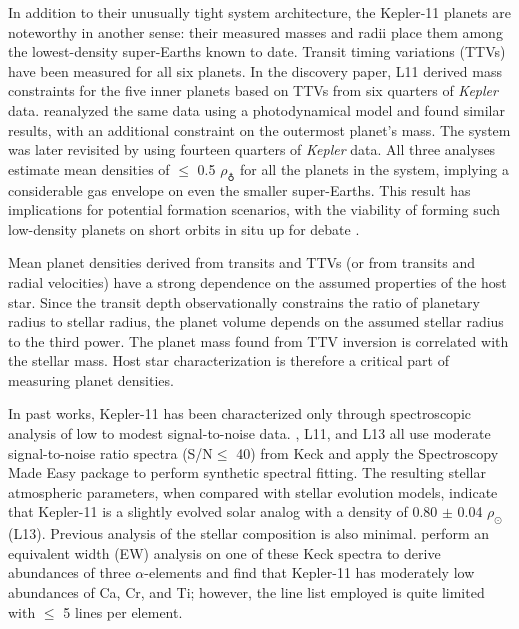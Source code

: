 \documentclass[twocolumn,trackchanges]{aastex61}
\newcommand{\Kepler}{\textit{Kepler} }
\begin{document}
In addition to their unusually tight system architecture, the Kepler-11 planets are noteworthy in another sense: their measured masses and radii place them among the lowest-density super-Earths known to date. Transit timing variations (TTVs) have been measured for all six planets. In the discovery paper,  L11 derived mass constraints for the five inner planets based on TTVs from six quarters of \Kepler data. \citet{Migaszewski2012} reanalyzed the same data using a photodynamical model and found similar results, with an additional constraint on the outermost planet's mass. The system was later revisited by \citet[][hereafter L13]{Lissauer2013} using fourteen quarters of \Kepler data. All three analyses estimate mean densities of $\leq$ 0.5 $\rho_{\earth}$ for all the planets in the system, implying a considerable gas envelope on even the smaller super-Earths. This result has implications for potential formation scenarios, with the viability of forming such low-density planets on short orbits in situ up for debate \citep[e.g.][]{Lopez2012, Chiang2013, Bodenheimer2014, Howe2015}.

Mean planet densities derived from transits and TTVs (or from transits and radial velocities) have a strong dependence on the assumed properties of the host star. Since the transit depth observationally constrains the ratio of planetary radius to stellar radius, the planet volume depends on the assumed stellar radius to the third power. The planet mass found from TTV inversion is correlated with the stellar mass. Host star characterization is therefore a critical part of measuring planet densities.

In past works, Kepler-11 has been characterized only through spectroscopic analysis of low to modest signal-to-noise data. \citet{Rowe2014}, L11, and L13 all use moderate signal-to-noise ratio spectra (S/N$\leq$ 40) from Keck and apply the Spectroscopy Made Easy package \citep[SME,][]{Valenti1996} to perform synthetic spectral fitting. The resulting stellar atmospheric parameters, when compared with stellar evolution models, indicate that Kepler-11 is a slightly evolved solar analog with a density of 0.80 $\pm$ 0.04 $\rho_{\odot}$ (L13).  Previous analysis of the stellar composition is also minimal. \citet{Adibekyan2012b} perform an equivalent width (EW) analysis on one of these Keck spectra to derive abundances of three $\alpha$-elements and find that Kepler-11 has moderately low abundances of Ca, Cr, and Ti; however, the line list employed is quite limited with $\leq$ 5 lines per element.
\end{document}
